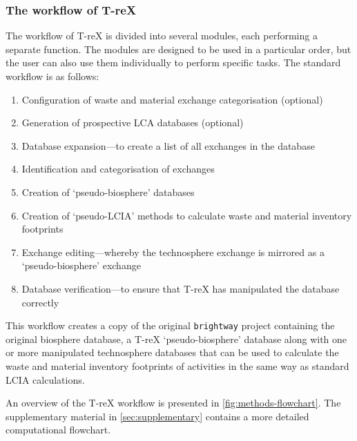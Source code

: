 \documentclass[a4paper,fleqn]{cas-dc}
\begin{document}


\subsubsection{The workflow of T-reX}

The workflow of T-reX is divided into several modules, each performing a separate function. The modules are designed to be used in a particular order, but the user can also use them individually to perform specific tasks. The standard workflow is as follows:

\begin{enumerate}
	\item Configuration of waste and material exchange categorisation (optional)
	\item Generation of prospective LCA databases (optional)
	\item Database expansion---to create a list of all exchanges in the database
	\item Identification and categorisation of exchanges
	\item Creation of `pseudo-biosphere' databases
	\item Creation of `pseudo-LCIA' methods to calculate waste and material inventory footprints
	\item Exchange editing---whereby the technosphere exchange is mirrored as a `pseudo-biosphere' exchange
	\item Database verification---to ensure that T-reX has manipulated the database correctly
\end{enumerate}

This workflow creates a copy of the original \texttt{brightway} project containing the original biosphere database, a T-reX `pseudo-biosphere' database along with one or more manipulated technosphere databases that can be used to calculate the waste and material inventory footprints of activities in the same way as standard LCIA calculations.

An overview of the T-reX workflow is presented in \autoref{fig:methods-flowchart}. The supplementary material in \autoref{sec:supplementary} contains a more detailed computational flowchart.
\end{document}
